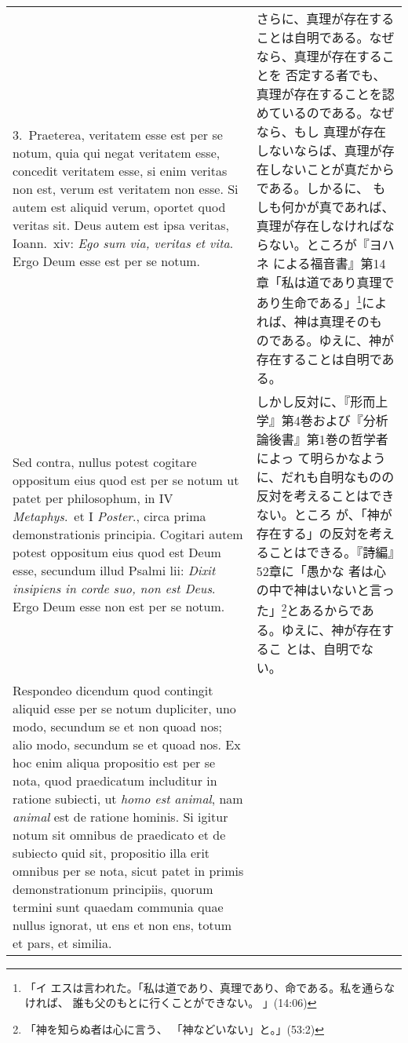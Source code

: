 \documentclass[10pt]{jsarticle}
\begin{document}
\begin{longtable}{p{21em}p{21em}}
\\


3.~{\sc Praeterea}, veritatem esse est per se notum, quia qui negat
veritatem esse, concedit veritatem esse, si enim veritas non est,
verum est veritatem non esse. Si autem est aliquid verum, oportet quod
veritas sit. Deus autem est ipsa veritas, Ioann.~{\sc xiv}: {\it Ego
sum via, veritas et vita}. Ergo Deum esse est per se notum.


&

さらに、真理が存在することは自明である。なぜなら、真理が存在することを
否定する者でも、真理が存在することを認めているのである。なぜなら、もし
真理が存在しないならば、真理が存在しないことが真だからである。しかるに、
もしも何かが真であれば、真理が存在しなければならない。ところが『ヨハネ
による福音書』第14章「私は道であり真理であり生命である」\footnote{「イ
エスは言われた。「私は道であり、真理であり、命である。私を通らなければ、
誰も父のもとに行くことができない。 」(14:06)}によれば、神は真理そのも
のである。ゆえに、神が存在することは自明である。

\\


{\sc Sed contra}, nullus potest cogitare oppositum eius quod est per
se notum ut patet per philosophum, in IV {\it Metaphys}.~et I {\it
Poster}., circa prima demonstrationis principia. Cogitari autem potest
oppositum eius quod est Deum esse, secundum illud Psalmi {\sc lii}:
{\it Dixit insipiens in corde suo, non est Deus}. Ergo Deum esse non
est per se notum.


&

しかし反対に、『形而上学』第4巻および『分析論後書』第1巻の哲学者によっ
て明らかなように、だれも自明なものの反対を考えることはできない。ところ
が、「神が存在する」の反対を考えることはできる。『詩編』52章に「愚かな
者は心の中で神はいないと言った」\footnote{「神を知らぬ者は心に言う、
「神などいない」と。」(53:2)}とあるからである。ゆえに、神が存在するこ
とは、自明でない。

\\


{\sc Respondeo dicendum} quod contingit aliquid esse per se notum
dupliciter, uno modo, secundum se et non quoad nos; alio modo,
secundum se et quoad nos. Ex hoc enim aliqua propositio est per se
nota, quod praedicatum includitur in ratione subiecti, ut {\it homo
est animal}, nam {\it animal} est de ratione hominis. Si igitur notum
sit omnibus de praedicato et de subiecto quid sit, propositio illa
erit omnibus per se nota, sicut patet in primis demonstrationum
principiis, quorum termini sunt quaedam communia quae nullus ignorat,
ut ens et non ens, totum et pars, et similia.



\end{longtable}
\end{document}
